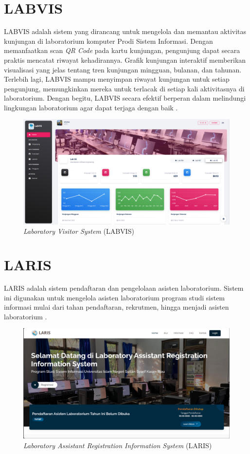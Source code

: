 \section{LABVIS}
LABVIS adalah sistem yang dirancang untuk mengelola dan memantau aktivitas kunjungan di laboratorium komputer Prodi Sistem Informasi. Dengan memanfaatkan scan \textit{QR Code} pada kartu kunjungan, pengunjung dapat secara praktis mencatat riwayat kehadirannya. Grafik kunjungan interaktif memberikan visualisasi yang jelas tentang tren kunjungan mingguan, bulanan, dan tahunan. Terlebih lagi, LABVIS mampu menyimpan riwayat kunjungan untuk setiap pengunjung, memungkinkan mereka untuk terlacak di setiap kali aktivitasnya di laboratorium. Dengan begitu, LABVIS secara efektif berperan dalam melindungi lingkungan laboratorium agar dapat terjaga dengan baik \cite{web-prodi}.

\begin{figure}
	\centering
	\includegraphics[width=0.82\linewidth]{konten//gambar/labvis.png}
	\caption{\textit{Laboratory Visitor System} (LABVIS) \protect\cite{web-prodi}}
	\label{fig:labvis}
\end{figure}

\section{LARIS}
LARIS adalah sistem pendaftaran dan pengelolaan asisten laboratorium. Sistem ini digunakan untuk mengelola asisten laboratorium program studi sistem informasi mulai dari tahan pendaftaran, rekrutmen, hingga menjadi asisten laboratorium \cite{web-prodi}.

\begin{figure}
	\centering
	\includegraphics[width=0.82\linewidth]{konten//gambar/laris.png}
	\caption{\textit{Laboratory Assistant Registration Information System} (LARIS) \protect\cite{web-prodi}}
	\label{fig:laris}
\end{figure}

